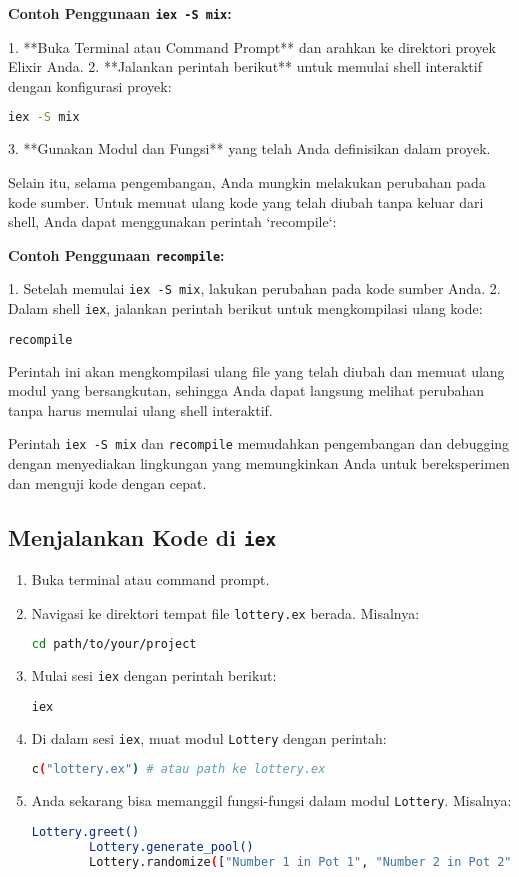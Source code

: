 \textbf{Contoh Penggunaan \texttt{iex -S mix}:}

1. **Buka Terminal atau Command Prompt** dan arahkan ke direktori proyek Elixir Anda.
2. **Jalankan perintah berikut** untuk memulai shell interaktif dengan konfigurasi proyek:
\begin{lstlisting}[language=bash]
	iex -S mix
\end{lstlisting}
3. **Gunakan Modul dan Fungsi** yang telah Anda definisikan dalam proyek.

Selain itu, selama pengembangan, Anda mungkin melakukan perubahan pada kode sumber. Untuk memuat ulang kode yang telah diubah tanpa keluar dari shell, Anda dapat menggunakan perintah `recompile`:

\textbf{Contoh Penggunaan \texttt{recompile}:}

1. Setelah memulai \texttt{iex -S mix}, lakukan perubahan pada kode sumber Anda.
2. Dalam shell \texttt{iex}, jalankan perintah berikut untuk mengkompilasi ulang kode:
\begin{lstlisting}[language=bash]
	recompile
\end{lstlisting}

Perintah ini akan mengkompilasi ulang file yang telah diubah dan memuat ulang modul yang bersangkutan, sehingga Anda dapat langsung melihat perubahan tanpa harus memulai ulang shell interaktif. 

Perintah \texttt{iex -S mix} dan \texttt{recompile} memudahkan pengembangan dan debugging dengan menyediakan lingkungan yang memungkinkan Anda untuk bereksperimen dan menguji kode dengan cepat.


\subsection{Menjalankan Kode di \texttt{iex}}

\begin{enumerate}
	\item Buka terminal atau command prompt.
	\item Navigasi ke direktori tempat file \texttt{lottery.ex} berada. Misalnya:
	\begin{lstlisting}[language=bash]
		cd path/to/your/project
	\end{lstlisting}
	\item Mulai sesi \texttt{iex} dengan perintah berikut:
	\begin{lstlisting}[language=bash]
		iex
	\end{lstlisting}
	\item Di dalam sesi \texttt{iex}, muat modul \texttt{Lottery} dengan perintah:
	\begin{lstlisting}[language=bash]
		c("lottery.ex") # atau path ke lottery.ex
	\end{lstlisting}
	\item Anda sekarang bisa memanggil fungsi-fungsi dalam modul \texttt{Lottery}. Misalnya:
	\begin{lstlisting}[language=bash]
		Lottery.greet()
		Lottery.generate_pool()
		Lottery.randomize(["Number 1 in Pot 1", "Number 2 in Pot 2"])
	\end{lstlisting}
\end{enumerate}

